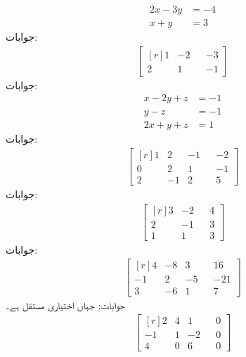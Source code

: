 \begin{align*}
2x-3y&=-4\\
x+y&=3
\end{align*}
جوابات:
\begin{align*}
\begin{bmatrix*}[r] 1&-2&&-3\\2&1&&-1 \end{bmatrix*}
\end{align*}
جوابات:
\begin{align*}
x-2y+z&=-1\\
y-z&=-1\\
2x+y+z&=1
\end{align*}
جوابات:
\begin{align*}
\begin{bmatrix*}[r]
1&2&-1&&-2\\0&2&1&&-1\\2&-1&2&&5
\end{bmatrix*}
\end{align*}
جوابات:
\begin{align*}
\begin{bmatrix*}[r] 
3&-2&&4\\
2&-1&&3\\
1&1&&3
\end{bmatrix*}
\end{align*}
جوابات:
\begin{align*}
\begin{bmatrix*}[r]  
4&-8&3&&16\\
-1&2&-5&&-21\\
3&-6&1&&7
\end{bmatrix*}
\end{align*}
جوابات: جہاں  اختیاری مستقل ہے۔
\begin{align*}
\begin{bmatrix*}[r]
2&4&1&&0\\
-1&1&-2&&0\\
4&0&6&&0
\end{bmatrix*}
\end{align*}
